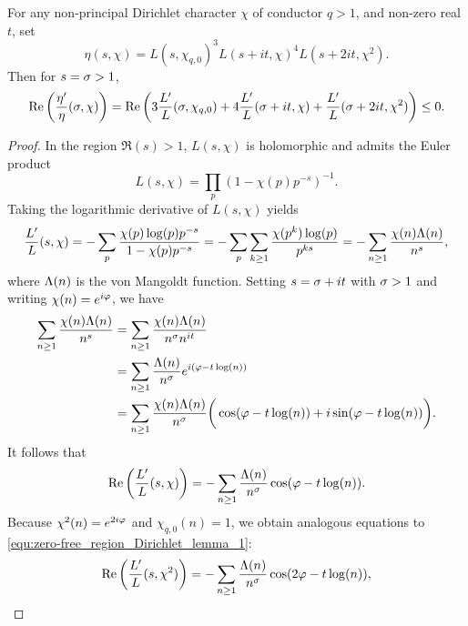       \begin{lemma}\label{lem:zero-free_region_Dirichlet_lemma}
        For any non-principal Dirichlet character $\chi$ of conductor $q > 1$, and non-zero real $t$, set
        \[
          \eta(s,\chi) = L(s,\chi_{q,0})^{3}L(s+it,\chi)^{4}L(s+2it,\chi^{2}).
        \]
        Then for $s = \sigma > 1$,
        \[
          \mathrm{Re}\left(\frac{\eta'}{\eta}(\sigma,\chi)\right) = \mathrm{Re}\left(3\frac{L'}{L}(\sigma,\chi_{q,0})+4\frac{L'}{L}(\sigma+it,\chi)+\frac{L'}{L}(\sigma+2it,\chi^{2})\right) \le 0.
        \]
      \end{lemma}
      \begin{proof}
        In the region $\Re(s) > 1$, $L(s,\chi)$ is holomorphic and admits the Euler product
        \[
          L(s,\chi) = \prod_{p}(1-\chi(p)p^{-s})^{-1}.
        \]
        Taking the logarithmic derivative of $L(s,\chi)$ yields
        \begin{equation}\label{equ:Drichlet_series_log_derivative_Dirichlet}
          \frac{L'}{L}(s,\chi) = -\sum_{p}\frac{\chi(p)\log(p)p^{-s}}{1-\chi(p)p^{-s}} = -\sum_{p}\sum_{k \ge 1}\frac{\chi(p^{k})\log(p)}{p^{ks}} = -\sum_{n \ge 1}\frac{\chi(n)\Lambda(n)}{n^{s}},
        \end{equation}
        where $\Lambda(n)$ is the von Mangoldt function. Setting $s = \sigma+it$ with $\sigma > 1$ and writing $\chi(n) = e^{i\varphi}$, we have
        \begin{align*}
          \sum_{n \ge 1}\frac{\chi(n)\Lambda(n)}{n^{s}} &= \sum_{n \ge 1}\frac{\chi(n)\Lambda(n)}{n^{\sigma}n^{it}} \\
          &= \sum_{n \ge 1}\frac{\Lambda(n)}{n^{\sigma}}e^{i(\varphi-t\log(n))} \\
          &= \sum_{n \ge 1}\frac{\chi(n)\Lambda(n)}{n^{\sigma}}\bigg(\cos(\varphi-t\log(n))+i\sin(\varphi-t\log(n))\bigg).
        \end{align*}
        It follows that
        \begin{equation}\label{equ:zero-free_region_Dirichlet_lemma_1}
          \mathrm{Re}\left(\frac{L'}{L}(s,\chi)\right) = -\sum_{n \ge 1}\frac{\Lambda(n)}{n^{\sigma}}\cos(\varphi-t\log(n)).
        \end{equation}
        Because $\chi^{2}(n) = e^{2i\varphi}$ and $\chi_{q,0}(n) = 1$, we obtain analogous equations to \cref{equ:zero-free_region_Dirichlet_lemma_1}:
        \begin{equation}\label{equ:zero-free_region_Dirichlet_lemma_2}
          \mathrm{Re}\left(\frac{L'}{L}(s,\chi^{2})\right) = -\sum_{n \ge 1}\frac{\Lambda(n)}{n^{\sigma}}\cos(2\varphi-t\log(n)),
        \end{equation}

\end{proof}
